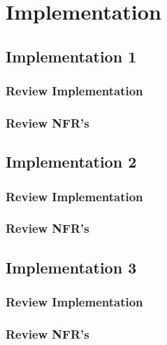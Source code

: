 
\graphicspath{{./sections/methology/assets}}

\chapter{Implementation}
\section{Implementation 1}
\subsection{Review Implementation}
\subsection{Review NFR's}
\section{Implementation 2}
\subsection{Review Implementation}
\subsection{Review NFR's}
\section{Implementation 3}
\subsection{Review Implementation}
\subsection{Review NFR's}